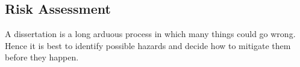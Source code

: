 \subsection{Risk Assessment}

A dissertation is a long arduous process in which many things could go wrong.
Hence it is best to identify possible hazards and decide how to mitigate them
before they happen.



    



